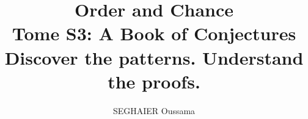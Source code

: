 \documentclass[11pt,openany]{book}
\title{\Huge\textbf{Order and Chance}\\[0.4em]\LARGE Tome S3: A Book of Conjectures\\[0.6em]
\Large Discover the patterns. Understand the proofs.}
\author{SEGHAIER Oussama}
\date{\the\year}
\begin{document}
\frontmatter
\makecover
\maketitle

\tableofcontents

\mainmatter













\end{document}
